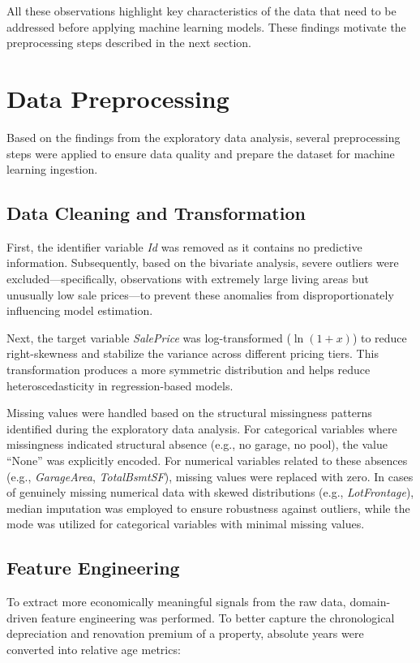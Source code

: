 \documentclass[12pt,a4paper,oneside,openany]{book}
\begin{document}
All these observations highlight key characteristics of the data that need to be addressed before applying machine learning models. These findings motivate the preprocessing steps described in the next section.

\section{Data Preprocessing}

Based on the findings from the exploratory data analysis, several preprocessing steps were applied to ensure data quality and prepare the dataset for machine learning ingestion.

\subsection{Data Cleaning and Transformation}
First, the identifier variable \textit{Id} was removed as it contains no predictive information. Subsequently, based on the bivariate analysis, severe outliers were excluded---specifically, observations with extremely large living areas but unusually low sale prices---to prevent these anomalies from disproportionately influencing model estimation.

Next, the target variable \textit{SalePrice} was log-transformed ($\ln(1+x)$) to reduce right-skewness and stabilize the variance across different pricing tiers. This transformation produces a more symmetric distribution and helps reduce heteroscedasticity in regression-based models.

Missing values were handled based on the structural missingness patterns identified during the exploratory data analysis. For categorical variables where missingness indicated structural absence (e.g., no garage, no pool), the value ``None'' was explicitly encoded. For numerical variables related to these absences (e.g., \textit{GarageArea}, \textit{TotalBsmtSF}), missing values were replaced with zero. In cases of genuinely missing numerical data with skewed distributions (e.g., \textit{LotFrontage}), median imputation was employed to ensure robustness against outliers, while the mode was utilized for categorical variables with minimal missing values.

\subsection{Feature Engineering}
To extract more economically meaningful signals from the raw data, domain-driven feature engineering was performed. To better capture the chronological depreciation and renovation premium of a property, absolute years were converted into relative age metrics:
\end{document}
